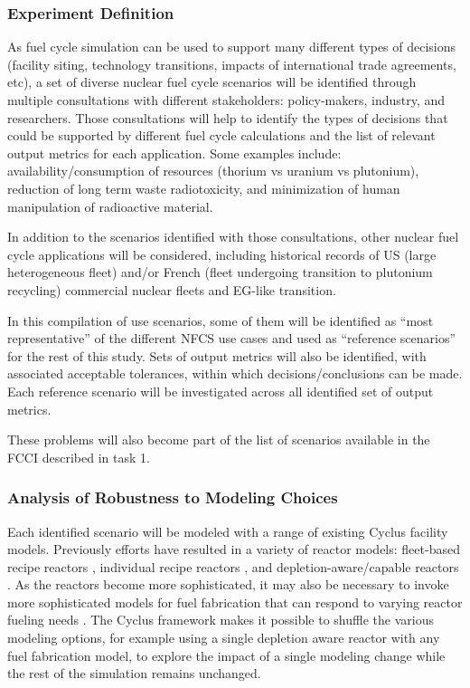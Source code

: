 \subsubsection{Experiment Definition}

As fuel cycle simulation can be used to support many different types of
decisions (facility siting, technology transitions, impacts of international
trade agreements, etc), a set of diverse nuclear fuel cycle scenarios will be
identified through multiple consultations with different stakeholders:
policy-makers, industry, and researchers.  Those consultations will help to
identify the types of decisions that could be supported by different fuel
cycle calculations and the list of relevant output metrics for each
application.  Some examples include: availability/consumption of resources
(thorium vs uranium vs plutonium), reduction of long term waste
radiotoxicity, and minimization of human manipulation of radioactive material.

In addition to the scenarios identified with those consultations, other
nuclear fuel cycle applications will be considered, including historical
records of US (large heterogeneous fleet) and/or French (fleet undergoing
transition to plutonium recycling)\cite{courtin.phd} commercial
nuclear fleets and EG-like transition\cite{Bo.ANSW.2016}.

In this compilation of use scenarios, some of them will be identified as
``most representative'' of the different \gls{NFCS} use cases and used as
``reference scenarios'' for the rest of this study. Sets of output metrics
will also be identified, with associated acceptable tolerances, within which
decisions/conclusions can be made. Each reference scenario will be
investigated across all identified set of output metrics.

These problems will also become part of the list of scenarios available in the
\gls{FCCI} described in task 1.

\subsubsection{Analysis of Robustness to Modeling Choices}

Each identified scenario will be modeled with a range of existing Cyclus
facility models.  Previously efforts have resulted in a variety of reactor
models: fleet-based recipe reactors \cite{carlsen.NT.2016}, individual recipe
reactors \cite{cycamore.1.5.0}, and depletion-aware/capable reactors
\cite{cyborg, brightlite.2015, cyclass.2016}.  As the reactors become more
sophisticated, it may also be necessary to invoke more sophisticated models for
fuel fabrication that can respond to varying reactor fueling needs
\cite{brightlite.2015, cyclass.2016}. The Cyclus framework makes it possible to
shuffle the various modeling options, for example using a single depletion aware
reactor with any fuel fabrication model, to explore the impact of a single
modeling change while the rest of the simulation remains unchanged.


